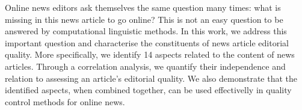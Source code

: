 Online news editors ask themselves the same question many times: what is missing in this news article to go online? This is not an easy question to be answered by computational linguistic methods. In this work, we address this important question and characterise the constituents of news article editorial quality. More specifically, we identify 14 aspects related to the content of news articles. Through a correlation analysis, we quantify their independence and relation to assessing an article's editorial quality. We also demonstrate that the identified aspects, when combined together, can be used effectivelly in quality control methods for online news.
